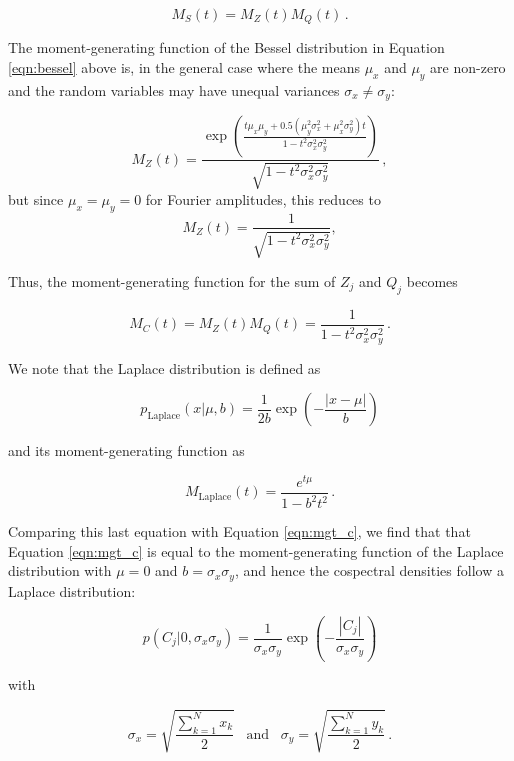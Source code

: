 \documentclass[12pt]{emulateapj}
\begin{document}
\begin{equation}
M_S(t) = M_Z(t) M_Q(t) \, .
\end{equation} 

\noindent The moment-generating function of the Bessel distribution in Equation \ref{eqn:bessel} above is, in the general case \citep{seijas2012} where the means $\mu_x$ and $\mu_y$ are non-zero and the random variables may have unequal variances $\sigma_x \neq \sigma_y$: 

\begin{equation}
M_Z(t) = \frac{\exp{\left( \frac{t\mu_x \mu_y + 0.5 (\mu_y^2 \sigma_x^2 + \mu_x^2 \sigma_y^2) t}{1 - t^2 \sigma_x^2 \sigma_y^2} \right)}}{\sqrt{1 - t^2 \sigma_x^2 \sigma_y^2}}\, ,
\end{equation}
but since $\mu_x = \mu_y = 0$ for Fourier amplitudes, this reduces to
\begin{equation}
M_Z(t) =  \frac{1}{\sqrt{1 - t^2 \sigma_x^2 \sigma_y^2}}  \label{eqn:mgf},
\end{equation}

Thus, the moment-generating function for the sum of $Z_j$ and $Q_j$ becomes

\begin{equation}
M_C(t) = M_Z(t) M_Q(t) = \frac{1}{1 - t^2 \sigma_x^2 \sigma_y^2} \, .
\label{eqn:mgt_c}
\end{equation}

\noindent We note that the Laplace distribution is defined as 

\[
p_{\mathrm{Laplace}}(x | \mu, b) = \frac{1}{2b} \exp{\left(-\frac{|x - \mu|}{b} \right)}
\]

\noindent and its moment-generating function as

\[
M_\mathrm{Laplace}(t) = \frac{e^{t\mu}}{1 - b^2 t^2} \, .
\]

Comparing this last equation with Equation \ref{eqn:mgt_c}, we find that that Equation \ref{eqn:mgt_c} is equal to the moment-generating function of the Laplace distribution with $\mu = 0$ and $b = \sigma_x \sigma_y$, and hence the cospectral densities follow a Laplace distribution:

\begin{equation}
p(C_j | 0, \sigma_x\sigma_y) = \frac{1}{\sigma_x \sigma_y} \exp{\left(- \frac{|C_j|}{\sigma_x\sigma_y} \right)} 
\label{eqn:laplace}
\end{equation}

\noindent with

\begin{equation}
\sigma_x =  \sqrt{\frac{\sum_{k=1}^{N}{x_k}}{2}} \;\;\; \mathrm{and} \;\;\; \sigma_y =  \sqrt{\frac{\sum_{k=1}^{N}{y_k}}{2}} \, .
\label{eqn:csdist}
\end{equation}
\end{document}
